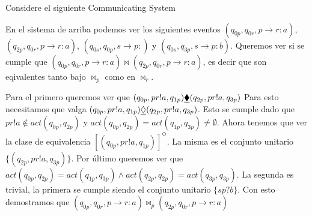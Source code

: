 \begin{example}
\label{ex:equiveventos}
Considere el siguiente Communicating System

\qquad
{} 
\qquad
{} 

En el sistema de arriba podemos ver los siguientes eventos $(q_{0p}, q_{0r}, p \rightarrow r:a)$, $(q_{2p}, q_{0r}, p \rightarrow r:a)$, $(q_{0s}, q_{0p}, s \rightarrow p:)$ y $(q_{0s}, q_{3p}, s \rightarrow p:b)$. Queremos ver si se cumple que $(q_{0p}, q_{0r}, p \rightarrow r:a) \bowtie (q_{2p}, q_{0r}, p \rightarrow r:a)$, es decir que son eqivalentes tanto bajo $\bowtie_p$ como en $\bowtie_r$. 

Para el primero queremos ver que $(q_{0p}, pr!a, q_{1p}) \underline{\blacklozenge} (q_{2p}, pr!a, q_{3p})$
Para esto necesitamos que valga $(q_{0p}, pr!a, q_{1p}) \underline{\Diamond} (q_{2p}, pr!a, q_{3p})$. Esto se cumple dado que $pr!a \notin act(q_{0p},q_{2p})$ y $act(q_{0p},q_{2p}) = act(q_{1p},q_{3p}) \neq \emptyset$. Ahora tenemos que ver la clase de equivalencia $[(q_{0p}, pr!a, q_{1p})]^{\Diamond}$. La misma es el conjunto unitario $ \{(q_{2p}, pr!a, q_{3p})\}$. Por último queremos ver que  $act(q_{0p}, q_{2p}) = 
act(q_{1p}, q_{3p}) \land act(q_{2p}, q_{2p}) = act(q_{3p}, q_{3p})$. La segunda es trivial, la primera se cumple siendo el conjunto unitario $\{sp?b\}$. Con esto demostramos que $(q_{0p}, q_{0r}, p \rightarrow r:a) \bowtie_p (q_{2p}, q_{0r}, p \rightarrow r:a)$ 


\end{example}

